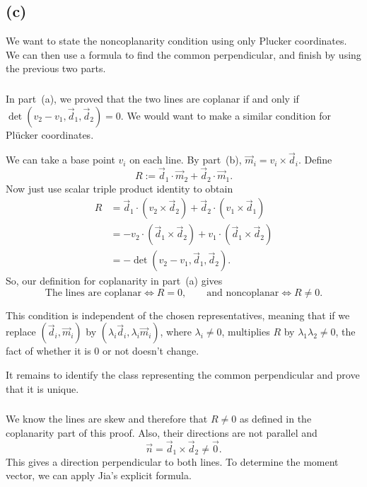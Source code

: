 \documentclass[11pt]{scrartcl}
\begin{document}
\subsection{(c)}

\begin{soln}
   We want to state the noncoplanarity condition using only Plucker coordinates. 
   We can then use a formula to find the common perpendicular, and finish by
   using the previous two parts.
\subsubsection*{}
In part~(a), we proved that the two lines are coplanar if and
only if $\det(v_2-v_1,\vec d_1,\vec d_2)=0$.
We would want to make a similar condition for 
 Pl\"ucker coordinates.

We can take a base point $v_i$ on each line. By part~(b),
$\vec m_i=v_i\times\vec d_i$. Define
\[
R:=\vec d_1\cdot\vec m_2+\vec d_2\cdot\vec m_1.
\]
Now just use scalar triple product identity to obtain
\begin{align*}
R
&=\vec d_1\cdot(v_2\times\vec d_2)
  +\vec d_2\cdot(v_1\times\vec d_1)\\
&=-v_2\cdot(\vec d_1\times\vec d_2)
  +v_1\cdot(\vec d_1\times\vec d_2)\\
&=-\det(v_2-v_1,\vec d_1,\vec d_2).
\end{align*}
So, our definition for coplanarity in part~(a) gives
\[
\boxed{
\text{The lines are coplanar}\iff R=0,
\qquad
\text{and noncoplanar}\iff R\neq0.
}
\]

This condition is independent of the chosen representatives, meaning that
if we 
replace $(\vec d_i,\vec m_i)$ by
$(\lambda_i\vec d_i,\lambda_i\vec m_i)$, where
$\lambda_i\neq0$, multiplies $R$ by
$\lambda_1\lambda_2\neq0$, the fact of whether it is $0$ or not doesn't 
change.

It remains to identify the class representing the common
perpendicular and prove that it is unique.


    \subsubsection*{}
    We know the lines are skew and therefore that $R \neq 0$ as defined in the coplanarity
	part of this proof.
     Also, their directions are not parallel and
    \[
    \vec n=\vec d_1\times\vec d_2\neq\vec0.
    \]
    This gives a direction perpendicular to both lines.
    To determine the moment vector, we can apply Jia's explicit formula.


\end{soln}
\end{document}
